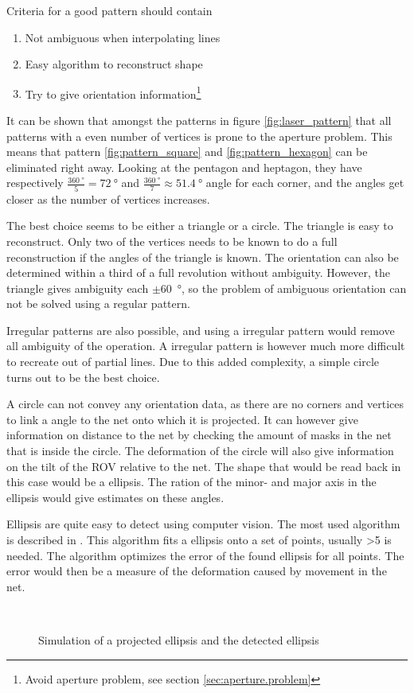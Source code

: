 Criteria for a good pattern should contain
\begin{enumerate}
	\item Not ambiguous when interpolating lines
	\item Easy algorithm to reconstruct shape
	\item Try to give orientation information\footnote{Avoid aperture problem, see section \vref{sec:aperture.problem}}
\end{enumerate}

It can be shown that amongst the patterns in figure \vref{fig:laser_pattern} that all patterns with a even number 
of vertices is prone to the aperture problem. This means that pattern \ref{fig:pattern_square} 
and \ref{fig:pattern_hexagon} can be eliminated right away. Looking at the pentagon and heptagon, they 
have respectively $\frac{\SI{360}{\degree}}{5} = \SI{72}{\degree}$ and $\frac{\SI{360}{\degree}}{7} \approx \SI{51.4}{\degree}$ angle 
for each corner, and the angles get closer as the number of vertices increases.

The best choice seems to be either a triangle or a circle. The triangle is easy to reconstruct. Only two of the vertices 
needs to be known to do a full reconstruction if the angles of the triangle is known. The orientation can 
also be determined within a third of a full revolution without ambiguity. However, the triangle 
gives ambiguity each $\pm$\SI{60}{\degree}, so the problem of ambiguous orientation can not be solved using a 
regular pattern.

Irregular patterns are also possible, and using a irregular pattern would remove all ambiguity of the operation. A irregular 
pattern is however much more difficult to recreate out of partial lines. Due to this added complexity, a simple circle turns out 
to be the best choice.

A circle can not convey any orientation data, as there are no corners and vertices to link a angle to the net onto which it is projected.
It can however give information on distance to the net by checking the amount of masks in the net that is inside the circle. The 
deformation of the circle will also give information on the tilt of the ROV relative to the net. The shape that would be read back in 
this case would be a ellipsis. The ration of the minor- and major axis in the ellipsis would give estimates on these angles. 

Ellipsis are quite easy to detect using computer vision. The most used algorithm is described in \citet{fitzgibbon95}. This algorithm fits a ellipsis onto a set of points, usually >5 is needed. The algorithm optimizes the error of the found ellipsis for all 
points. The error would then be a measure of the deformation caused by movement in the net.

\begin{figure}[htbp]
    \centering
    \\
	\caption{Simulation of a projected ellipsis and the detected ellipsis}
	\label{fig:ellipsis}
\end{figure}